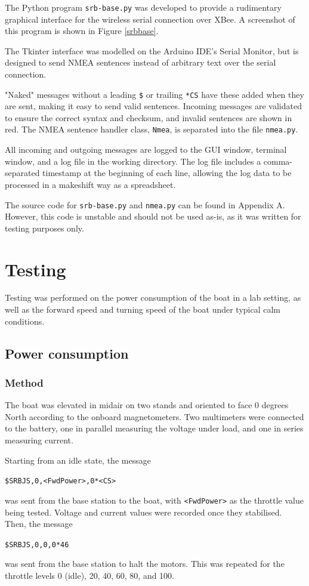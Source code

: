 \documentclass[a4paper]{IEEEtran}
\begin{document}
The Python program \texttt{srb-base.py} was developed to provide a rudimentary graphical interface for the wireless serial connection over XBee. A screenshot of this program is shown in Figure \ref{srbbase}.

The Tkinter interface was modelled on the Arduino IDE's Serial Monitor, but is designed to send NMEA sentences instead of arbitrary text over the serial connection.

"Naked" messages without a leading \texttt{\$} or trailing \texttt{*CS} have these added when they are sent, making it easy to send valid sentences. Incoming messages are validated to ensure the correct syntax and checksum, and invalid sentences are shown in red. The NMEA sentence handler class, \texttt{Nmea}, is separated into the file \texttt{nmea.py}.

All incoming and outgoing messages are logged to the GUI window, terminal window, and a log file in the working directory. The log file includes a comma-separated timestamp at the beginning of each line, allowing the log data to be processed in a makeshift way as a spreadsheet.

The source code for \texttt{srb-base.py} and \texttt{nmea.py} can be found in Appendix A. However, this code is unstable and should not be used as-is, as it was written for testing purposes only.

\section{Testing}
Testing was performed on the power consumption of the boat in a lab setting, as well as the forward speed and turning speed of the boat under typical calm conditions.

\subsection{Power consumption}

\subsubsection{Method}
The boat was elevated in midair on two stands and oriented to face 0 degrees North according to the onboard magnetometers. Two multimeters were connected to the battery, one in parallel measuring the voltage under load, and one in series measuring current.

Starting from an idle state, the message
\begin{center}
\texttt{\$SRBJS,0,<FwdPower>,0*<CS>}
\end{center}
was sent from the base station to the boat, with \texttt{<FwdPower>} as the throttle value being tested. Voltage and current values were recorded once they stabilised. Then, the message
\begin{center}
\texttt{\$SRBJS,0,0,0*46}
\end{center}
was sent from the base station to halt the motors. This was repeated for the throttle levels 0 (idle), 20, 40, 60, 80, and 100.
\end{document}

